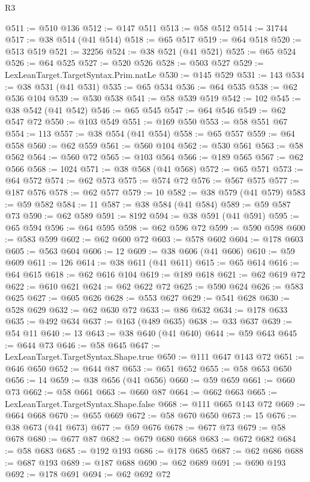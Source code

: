 \begin{lexlean}{R3}
\begin{coremodule}
@511 := @510 @136
@512 := @147 @511
@513 := @58 @512
@514 := 31744
@517 := @38 @514 (@41 @514)
@518 := @65 @517
@519 := @64 @518
@520 := @513 @519
@521 := 32256
@524 := @38 @521 (@41 @521)
@525 := @65 @524
@526 := @64 @525
@527 := @520 @526
@528 := @503 @527
@529 := LexLeanTarget.TargetSyntax.Prim.natLe
@530 := @145 @529
@531 := 143
@534 := @38 @531 (@41 @531)
@535 := @65 @534
@536 := @64 @535
@538 := @62 @536 @104
@539 := @530 @538
@541 := @58 @539 @519
@542 := 102
@545 := @38 @542 (@41 @542)
@546 := @65 @545
@547 := @64 @546
@549 := @62 @547 @72
@550 := @103 @549
@551 := @169 @550
@553 := @58 @551 @67
@554 := 113
@557 := @38 @554 (@41 @554)
@558 := @65 @557
@559 := @64 @558
@560 := @62 @559
@561 := @560 @104
@562 := @530 @561
@563 := @58 @562
@564 := @560 @72
@565 := @103 @564
@566 := @189 @565
@567 := @62 @566
@568 := 1024
@571 := @38 @568 (@41 @568)
@572 := @65 @571
@573 := @64 @572
@574 := @62 @573
@575 := @574 @72
@576 := @567 @575
@577 := @187 @576
@578 := @62 @577
@579 := 10
@582 := @38 @579 (@41 @579)
@583 := @59 @582
@584 := 11
@587 := @38 @584 (@41 @584)
@589 := @59 @587 @73
@590 := @62 @589
@591 := 8192
@594 := @38 @591 (@41 @591)
@595 := @65 @594
@596 := @64 @595
@598 := @62 @596 @72
@599 := @590 @598
@600 := @583 @599
@602 := @62 @600 @72
@603 := @578 @602
@604 := @178 @603
@605 := @563 @604
@606 := 12
@609 := @38 @606 (@41 @606)
@610 := @59 @609
@611 := 126
@614 := @38 @611 (@41 @611)
@615 := @65 @614
@616 := @64 @615
@618 := @62 @616 @104
@619 := @189 @618
@621 := @62 @619 @72
@622 := @610 @621
@624 := @62 @622 @72
@625 := @590 @624
@626 := @583 @625
@627 := @605 @626
@628 := @553 @627
@629 := @541 @628
@630 := @528 @629
@632 := @62 @630 @72
@633 := @86 @632
@634 := @178 @633
@635 := @492 @634
@637 := @163 (@489 @635)
@638 := @33 @637
@639 := @54 @11
@640 := 13
@643 := @38 @640 (@41 @640)
@644 := @59 @643
@645 := @644 @73
@646 := @58 @645
@647 := LexLeanTarget.TargetSyntax.Shape.true
@650 := @111 @647 @143 @72
@651 := @646 @650
@652 := @644 @87
@653 := @651 @652
@655 := @58 @653 @650
@656 := 14
@659 := @38 @656 (@41 @656)
@660 := @59 @659
@661 := @660 @73
@662 := @58 @661
@663 := @660 @87
@664 := @662 @663
@665 := LexLeanTarget.TargetSyntax.Shape.false
@668 := @111 @665 @143 @72
@669 := @664 @668
@670 := @655 @669
@672 := @58 @670 @650
@673 := 15
@676 := @38 @673 (@41 @673)
@677 := @59 @676
@678 := @677 @73
@679 := @58 @678
@680 := @677 @87
@682 := @679 @680 @668
@683 := @672 @682
@684 := @58 @683
@685 := @192 @193
@686 := @178 @685
@687 := @62 @686
@688 := @687 @193
@689 := @187 @688
@690 := @62 @689
@691 := @690 @193
@692 := @178 @691
@694 := @62 @692 @72

\end{coremodule}
\end{lexlean}
